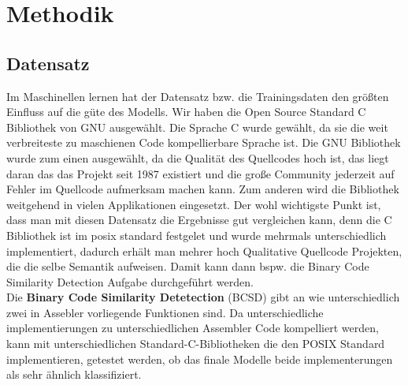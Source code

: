 \documentclass[12pt,letterpaper,ngerman]{article}
\begin{document}
\section{Methodik}
\subsection{Datensatz}
Im Maschinellen lernen hat der Datensatz bzw. die Trainingsdaten den
größten Einfluss auf die güte des Modells. Wir haben die 
Open Source Standard C Bibliothek von GNU ausgewählt.
Die Sprache C wurde gewählt, da sie die weit verbreiteste zu 
maschienen Code kompellierbare Sprache ist. Die GNU Bibliothek 
wurde zum einen ausgewählt, da
die Qualität des Quellcodes hoch ist, das liegt daran das das Projekt 
seit 1987 existiert 
und die große Community jederzeit auf Fehler im Quellcode aufmerksam
machen kann. Zum anderen wird die Bibliothek weitgehend in vielen
Applikationen eingesetzt. Der wohl wichtigste Punkt ist, dass
man mit diesen Datensatz die Ergebnisse gut vergleichen kann, denn
die C Bibliothek ist im posix standard festgelet und wurde mehrmals
unterschiedlich implementiert, dadurch erhält man mehrer hoch Qualitative
Quellcode Projekten, die die selbe Semantik aufweisen. Damit kann dann 
bspw. die Binary Code Similarity Detection Aufgabe durchgeführt werden.\\
Die {\bf Binary Code Similarity Detetection} (BCSD) gibt an wie 
unterschiedlich zwei  in Assebler vorliegende Funktionen sind.
Da unterschiedliche implementierungen zu unterschiedlichen 
Assembler Code kompelliert werden, kann mit unterschiedlichen
Standard-C-Bibliotheken die den POSIX Standard implementieren,
getestet werden, ob das finale Modelle beide implementerungen 
als sehr ähnlich klassifiziert.

\end{document}
